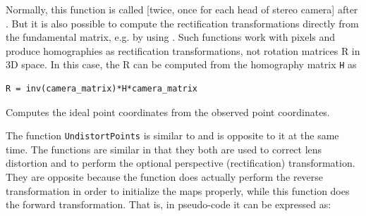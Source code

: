 Normally, this function is called [twice, once for each head of stereo camera] after . But it is also possible to compute the rectification transformations directly from the fundamental matrix, e.g. by using . Such functions work with pixels and produce homographies as rectification transformations, not rotation matrices R in 3D space. In this case, the R can be computed from the homography matrix \texttt{H} as 

\begin{lstlisting}
R = inv(camera_matrix)*H*camera_matrix
\end{lstlisting}


Computes the ideal point coordinates from the observed point coordinates.


\begin{description}
\end{description}

The function \texttt{UndistortPoints} is similar to  and is opposite to it at the same time. The functions are similar in that they both are used to correct lens distortion and to perform the optional perspective (rectification) transformation. They are opposite because the function  does actually perform the reverse transformation in order to initialize the maps properly, while this function does the forward transformation. That is, in pseudo-code it can be expressed as:

